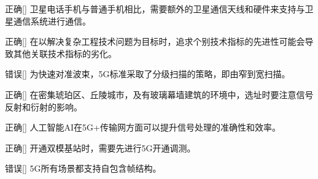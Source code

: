\begin{choice}{\;正确\;}[]
    卫星电话手机与普通手机相比，需要额外的卫星通信天线和硬件来支持与卫星通信系统进行通信。
\end{choice}

\begin{choice}{\;正确\;}[]
    在以解决复杂工程技术问题为目标时，追求个别技术指标的先进性可能会导致其他关联技术指标的劣化。

\end{choice}

\begin{choice}{\;错误\;}[]
    为快速对准波束，5G标准采取了分级扫描的策略，即由窄到宽扫描。

\end{choice}

\begin{choice}{\;正确\;}[]
    在密集琥珀区、丘陵城市，及有玻璃幕墙建筑的环境中，选址时要注意信号反射和衍射的影响。

\end{choice}

\begin{choice}{\;正确\;}[]
    人工智能AI在5G+传输网方面可以提升信号处理的准确性和效率。

\end{choice}

\begin{choice}{\;正确\;}[]
    开通双模基站时，需要先进行5G开通调测。

\end{choice}

\begin{choice}{\;错误\;}[]
    5G所有场景都支持自包含帧结构。

\end{choice}









